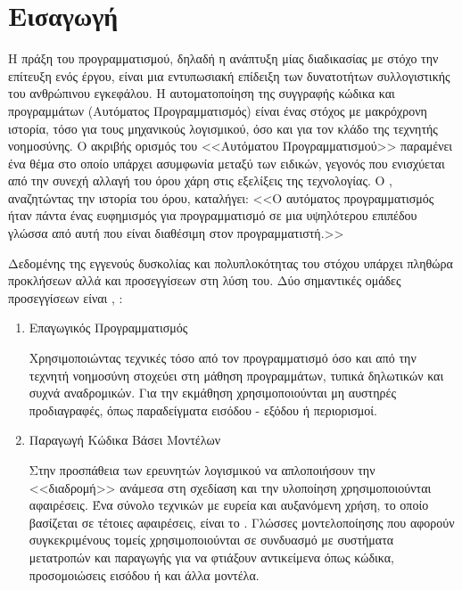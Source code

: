 \chapter{Εισαγωγή}

Η πράξη του προγραμματισμού, δηλαδή η ανάπτυξη μίας διαδικασίας με στόχο την επίτευξη ενός έργου, είναι μια εντυπωσιακή επίδειξη των δυνατοτήτων συλλογιστικής του ανθρώπινου εγκεφάλου.
Η αυτοματοποίηση της συγγραφής κώδικα και προγραμμάτων (Αυτόματος Προγραμματισμός) είναι ένας στόχος με μακρόχρονη ιστορία, τόσο για τους μηχανικούς λογισμικού, όσο και για τον κλάδο της τεχνητής νοημοσύνης.
Ο ακριβής ορισμός του <<Αυτόματου Προγραμματισμού>> παραμένει ένα θέμα στο οποίο υπάρχει ασυμφωνία μεταξύ των ειδικών, γεγονός που ενισχύεται από την συνεχή αλλαγή του όρου χάρη στις εξελίξεις της τεχνολογίας.
Ο , αναζητώντας την ιστορία του όρου, καταλήγει: <<Ο αυτόματος προγραμματισμός ήταν πάντα ένας ευφημισμός για προγραμματισμό σε μια υψηλότερου επιπέδου γλώσσα από αυτή που είναι διαθέσιμη στον προγραμματιστή.>> \cite{Parnas1985}

Δεδομένης της εγγενούς δυσκολίας και πολυπλοκότητας του στόχου υπάρχει πληθώρα προκλήσεων αλλά και προσεγγίσεων στη λύση του.
Δύο σημαντικές ομάδες προσεγγίσεων είναι \cite{Biermann1985}, \cite{Schmidt2006}:

\begin{enumerate}
\item Επαγωγικός Προγραμματισμός  

Χρησιμοποιώντας τεχνικές τόσο από τον προγραμματισμό όσο και από την τεχνητή νοημοσύνη στοχεύει στη μάθηση προγραμμάτων, τυπικά δηλωτικών και συχνά αναδρομικών.
Για την εκμάθηση χρησιμοποιούνται μη αυστηρές προδιαγραφές, όπως παραδείγματα εισόδου - εξόδου ή περιορισμοί.
\item Παραγωγή Κώδικα Βάσει Μοντέλων 

Στην προσπάθεια των ερευνητών λογισμικού να απλοποιήσουν την <<διαδρομή>> ανάμεσα στη σχεδίαση και την υλοποίηση χρησιμοποιούνται αφαιρέσεις.
Ένα σύνολο τεχνικών με ευρεία και αυξανόμενη χρήση, το οποίο βασίζεται σε τέτοιες αφαιρέσεις, είναι το .
Γλώσσες μοντελοποίησης που αφορούν συγκεκριμένους τομείς  χρησιμοποιούνται σε συνδυασμό με συστήματα μετατροπών και παραγωγής  για να φτιάξουν αντικείμενα όπως κώδικα, προσομοιώσεις εισόδου ή και άλλα μοντέλα. 
\end{enumerate}

